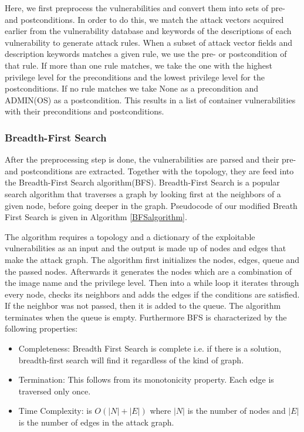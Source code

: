 \documentclass[letterpaper, 10 pt, conference]{ieeeconf}  %
\begin{document}
Here, we first preprocess the vulnerabilities and convert them into sets of pre- and postconditions. In order to do this, we match the attack vectors acquired earlier from the vulnerability database and keywords of the descriptions of each vulnerability to generate attack rules. When a subset of attack vector fields and description keywords matches a given rule, we use the pre- or postcondition of that rule. If more than one rule matches, we take the one with the highest privilege level for the preconditions and the lowest privilege level for the postconditions. If no rule matches we take None as a precondition and ADMIN(OS) as a postcondition. This results in a list of container vulnerabilities with their preconditions and postconditions.

\subsubsection{Breadth-First Search}

After the preprocessing step is done, the vulnerabilities are parsed and their pre- and postconditions are extracted. Together with the topology, they are feed into the Breadth-First Search algorithm(BFS).
Breadth-First Search is a popular search algorithm that traverses a graph by looking first at the neighbors of a given node, before going deeper in the graph. Pseudocode of our modified Breath First Search is given in Algorithm \ref{BFSalgorithm}. 

The algorithm requires a topology and a dictionary of the exploitable vulnerabilities as an input and the output is made up of nodes and edges that make the attack graph. 
The algorithm first initializes the nodes, edges, queue and the passed nodes. Afterwards it generates the nodes which are a combination of the image name and the privilege level.
Then into a while loop it iterates through every node, checks its neighbors and adds the edges if the conditions are satisfied. If the neighbor was not passed, then it is added to the queue. The algorithm terminates when the queue is empty. Furthermore BFS is characterized by the following properties:

\begin{itemize}
 \item Completeness: Breadth First Search is complete i.e. if there is a solution, breadth-first search will find it regardless of the kind of graph.
 \item Termination: This follows from its monotonicity property. Each edge is traversed only once.
 \item Time Complexity: is $O(|N| + |E|)$ where $|N|$ is the number of nodes and $|E|$ is the number of edges in the attack graph.
\end{itemize}
\end{document}
